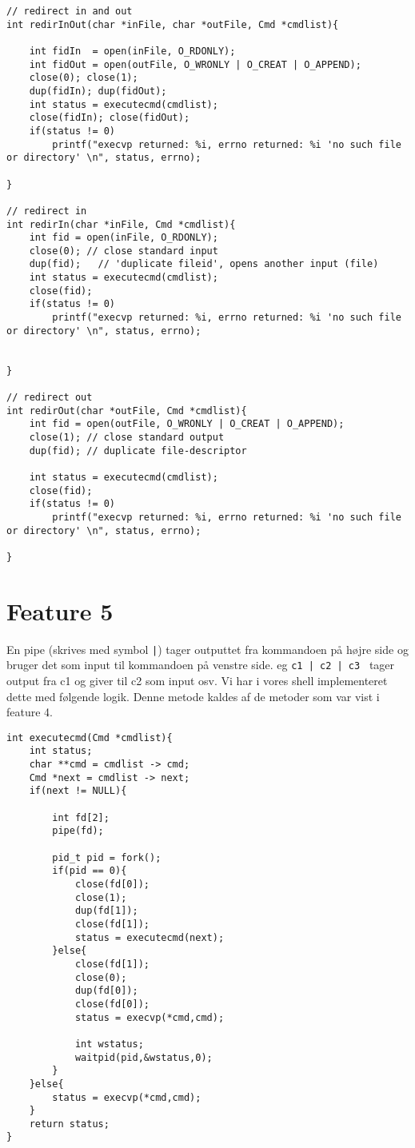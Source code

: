 \documentclass[danish]{report}
\begin{document}
\begin{lstlisting}
// redirect in and out
int redirInOut(char *inFile, char *outFile, Cmd *cmdlist){
    
    int fidIn  = open(inFile, O_RDONLY);
    int fidOut = open(outFile, O_WRONLY | O_CREAT | O_APPEND);              
    close(0); close(1);
    dup(fidIn); dup(fidOut);
    int status = executecmd(cmdlist);
    close(fidIn); close(fidOut);
    if(status != 0) 
        printf("execvp returned: %i, errno returned: %i 'no such file or directory' \n", status, errno);

}

// redirect in
int redirIn(char *inFile, Cmd *cmdlist){
    int fid = open(inFile, O_RDONLY);  
    close(0); // close standard input
    dup(fid);   // 'duplicate fileid', opens another input (file)    
    int status = executecmd(cmdlist);
    close(fid);             
    if(status != 0) 
        printf("execvp returned: %i, errno returned: %i 'no such file or directory' \n", status, errno);


}

// redirect out
int redirOut(char *outFile, Cmd *cmdlist){
    int fid = open(outFile, O_WRONLY | O_CREAT | O_APPEND);         
    close(1); // close standard output
    dup(fid); // duplicate file-descriptor

    int status = executecmd(cmdlist);
    close(fid);             
    if(status != 0) 
        printf("execvp returned: %i, errno returned: %i 'no such file or directory' \n", status, errno);

}
\end{lstlisting}





\section{Feature 5}

En pipe (skrives med symbol {\tt |}) tager outputtet fra kommandoen på højre side og bruger det som input til kommandoen på venstre side. eg {\tt c1 | c2 | c3 } tager output fra c1 og giver til c2 som input osv. Vi har i vores shell implementeret dette med følgende logik. Denne metode kaldes af de metoder som var vist i feature 4.

\begin{lstlisting}
int executecmd(Cmd *cmdlist){
    int status;
    char **cmd = cmdlist -> cmd;
    Cmd *next = cmdlist -> next;
    if(next != NULL){

        int fd[2];
        pipe(fd);

        pid_t pid = fork();
        if(pid == 0){
            close(fd[0]);
            close(1);
            dup(fd[1]);
            close(fd[1]);
            status = executecmd(next);
        }else{
            close(fd[1]);
            close(0);
            dup(fd[0]);
            close(fd[0]);
            status = execvp(*cmd,cmd);
            
            int wstatus;
            waitpid(pid,&wstatus,0);
        }
    }else{
        status = execvp(*cmd,cmd);
    }
    return status;
}

\end{lstlisting}
\end{document}
